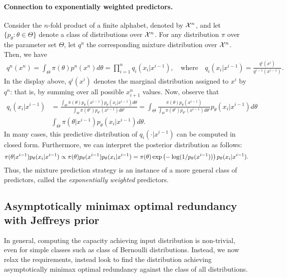     \paragraph{Connection to exponentially weighted predictors.} Consider the $n$-fold product of a finite alphabet, denoted by $\mathcal{X}^n$, and let $\{p_{\theta}: \theta \in \Theta\}$ denote a class of distributions over $\mathcal{X}^n$. For any distribution $\pi$ over the parameter set $\Theta$, let $q^n$ the corresponding mixture distribution over $\mathcal{X}^n$. Then, we have 
    \begin{align}
        q^n(x^n) = \int_{\Theta} \pi(\theta) p^n(x^n) d\theta = \prod_{i=1}^n q_i(x_i|x^{i-1}), \quad \text{where} \quad q_i(x_i|x^{i-1}) = \frac{q^i(x^i)}{q^{i-1}(x^{i-1})}. 
    \end{align}
    In the display above, $q^i(x^i)$ denotes the marginal distribution assigned to $x^i$ by $q^n$: that is, by summing over all possible $x_{i+1}^n$ values. Now, observe that 
    \begin{align}
        q_i(x_i|x^{i-1}) &= \frac{ \int_{\Theta} \pi(\theta) p_{\theta}(x^{i-1}) p_{\theta}(x_i|x^{i-1})d\theta }{\int_{\Theta} \pi(\theta')  p_{\theta'}(x^{i-1})d\theta'} = 
        \int_{\Theta} \frac{  \pi(\theta) p_{\theta}(x^{i-1}) }{\int_{\Theta} \pi(\theta')  p_{\theta'}(x^{i-1})d\theta'} p_{\theta}(x_i|x^{i-1})d\theta  \\
        & \int_{\Theta} \pi(\theta|x^{i-1}) p_{\theta}(x_i| x^{i-1}) d\theta. 
    \end{align}
    In many cases, this predictive distribution of $q_i(\cdot|x^{i-1})$ can be computed in closed form. Furthermore, we can interpret the posterior distribution as follows: 
    \begin{align}
        \pi(\theta|x^{i-1}) p_{\theta}(x_i|x^{i-1}) \propto \pi(\theta) p_{\theta}(x^{i-1}) p_{\theta}(x_i|x^{i-1}) = \pi(\theta) \exp \left( - \log(1/p_{\theta}(x^{i-1})) \right)  p_{\theta}(x_i|x^{i-1}). 
    \end{align}
    Thus, the mixture prediction strategy is an instance of a more general class of predictors, called the \emph{exponentially weighted} predictors. 
    
\subsection{Asymptotically minimax optimal redundancy with Jeffreys prior}
\label{sec:jeffreys-1}
    In general, computing the capacity achieving input distribution is non-trivial, even for simple classes such as class of \iid Bernoulli distributions. Instead, we now relax the requirements, instead look to find the distribution achieving asymptotically minimax optimal redundancy against the class of all \iid distributions. 

